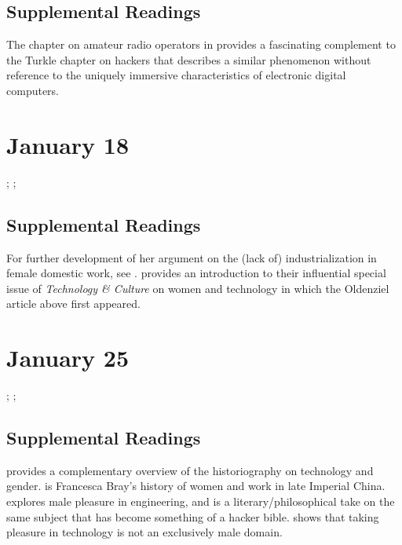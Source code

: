 \documentclass[11pt]{article}
\begin{document}


\subsection{Supplemental Readings}

\noindent The chapter on amateur radio operators in \cite{Douglas1987} provides a fascinating complement to the Turkle chapter on hackers that describes a similar phenomenon without reference to the uniquely immersive characteristics of electronic digital computers.  

\section{January 18}
\label{sec:org3570e6c}

; ; 

\subsection{Supplemental Readings}
\label{sec:orgadb53ae}

For further development of her argument on the (lack of)
industrialization in female domestic work, see \cite{Cowan:1983vm}.
\cite{Lerman:1997ui} provides an introduction to their influential
special issue of \emph{Technology \& Culture} on women and technology in which
the Oldenziel article above first appeared.

\section{January 25}
\label{sec:orgb32e610}

; ; 

\subsection{Supplemental Readings}
\label{sec:org7a43bb5}

\cite{Wajcman:2000vq} provides a complementary overview of the historiography on technology and gender.  \cite{Bray:1997wl} is Francesca Bray’s history of women and work in late Imperial China.   \cite{Florman:1996um} explores male pleasure in engineering, and \cite{Pirsig:1974vs} is a literary/philosophical take on the same subject that has become something of a hacker bible.   \cite{Ullman:1997vv} shows that taking pleasure in technology is not an exclusively male domain. 
\end{document}
